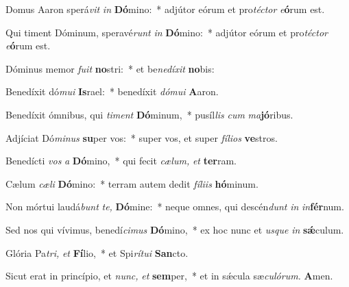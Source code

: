 \item Domus Aaron sperá\textit{vit} \textit{in} \textbf{Dó}mino:~* adjútor eórum et pro\textit{téctor} \textit{e}\textbf{ó}rum est.
\item Qui timent Dóminum, speravé\textit{runt} \textit{in} \textbf{Dó}mino:~* adjútor eórum et pro\textit{téctor} \textit{e}\textbf{ó}rum est.
\item Dóminus memor \textit{fuit} \textbf{no}stri:~* et be\textit{nedíxit} \textbf{no}bis:
\item Benedíxit dó\textit{mui} \textbf{Is}rael:~* benedíxit \textit{dómui} \textbf{A}aron.
\item Benedíxit ómnibus, qui \textit{timent} \textbf{Dó}minum,~* pusíl\textit{lis} \textit{cum} \textit{ma}\textbf{jó}ribus.
\item Adjíciat Dó\textit{minus} \textbf{su}per vos:~* super vos, et super \textit{fílios} \textbf{ve}stros.
\item Benedícti \textit{vos} \textit{a} \textbf{Dó}mino,~* qui fecit \textit{cælum,} \textit{et} \textbf{ter}ram.
\item Cælum \textit{cæli} \textbf{Dó}mino:~* terram autem dedit \textit{fíliis} \textbf{hó}minum.
\item Non mórtui laudá\textit{bunt} \textit{te,} \textbf{Dó}mine:~* neque omnes, qui descén\textit{dunt} \textit{in} \textit{in}\textbf{fér}num.
\item Sed nos qui vívimus, benedí\textit{cimus} \textbf{Dó}mino,~* ex hoc nunc et \textit{usque} \textit{in} \textbf{sǽ}culum.
\item Glória Pa\tinyhspace\textit{tri,} \textit{et} \textbf{Fí}lio,~* et Spi\tinyhspace\textit{rítui} \textbf{San}cto.
\item Sicut erat in princípio, et \textit{nunc,} \textit{et} \textbf{sem}per,~* et in sǽcula sæ\tinyhspace\textit{culórum.} \textbf{A}men.
